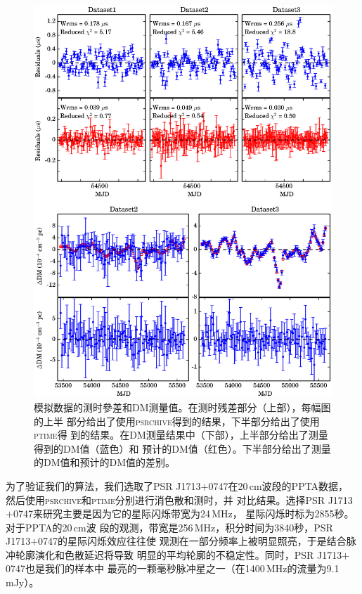 \begin{figure}
\center
\includegraphics[width=5.5 in]{sim3.ps}
\caption{模拟数据的测时參差和DM测量值。在测时残差部分（上部），每幅图的上半
部分给出了使用\textsc{psrchive}得到的结果，下半部分给出了使用\textsc{ptime}得
到的结果。在DM测量结果中（下部），上半部分给出了测量得到的DM值（蓝色）和
预计的DM值（红色）。下半部分给出了测量的DM值和预计的DM值的差别。}
\label{simTiming}
\end{figure}

为了验证我们的算法，我们选取了PSR J1713$+$0747在20\,cm波段的PPTA数据，
然后使用\textsc{psrchive}和\textsc{ptime}分别进行消色散和测时，并
对比结果。选择PSR J1713$+$0747来研究主要是因为它的星际闪烁带宽为24\,MHz，
星际闪烁时标为2855秒\supercite{Keith13}。对于PPTA的20\,cm波
段的观测，带宽是256\,MHz，积分时间为3840秒，PSR J1713$+$0747的星际闪烁效应往往使
观测在一部分频率上被明显照亮，于是结合脉冲轮廓演化和色散延迟将导致
明显的平均轮廓的不稳定性。同时，PSR J1713$+$0747也是我们的样本中
最亮的一颗毫秒脉冲星之一（在1400\,MHz的流量为9.1\,mJy）。

